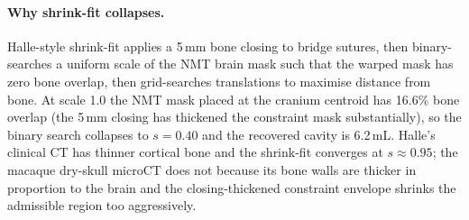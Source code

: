 \documentclass{compactarticle}
\begin{document}
\paragraph{Why shrink-fit collapses.}
Halle-style shrink-fit applies a 5\,mm bone closing to bridge
sutures, then binary-searches a uniform scale of the NMT brain mask
such that the warped mask has zero bone overlap, then grid-searches
translations to maximise distance from bone. At scale 1.0 the NMT
mask placed at the cranium centroid has 16.6\% bone overlap (the
5\,mm closing has thickened the constraint mask substantially), so
the binary search collapses to $s=0.40$ and the recovered cavity is
6.2\,mL. Halle's clinical CT has thinner cortical bone and the
shrink-fit converges at $s\approx0.95$; the macaque dry-skull microCT
does not because its bone walls are thicker in proportion to the
brain and the closing-thickened constraint envelope shrinks the
admissible region too aggressively.
\end{document}

